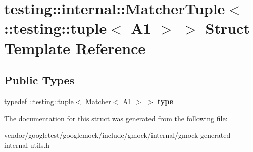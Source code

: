 \hypertarget{structtesting_1_1internal_1_1_matcher_tuple_3_01_1_1testing_1_1tuple_3_01_a1_01_4_01_4}{}\section{testing\+:\+:internal\+:\+:Matcher\+Tuple$<$ \+:\+:testing\+:\+:tuple$<$ A1 $>$ $>$ Struct Template Reference}
\label{structtesting_1_1internal_1_1_matcher_tuple_3_01_1_1testing_1_1tuple_3_01_a1_01_4_01_4}
\subsection*{Public Types}
\begin{DoxyCompactItemize}
\item 
\mbox{\label{structtesting_1_1internal_1_1_matcher_tuple_3_01_1_1testing_1_1tuple_3_01_a1_01_4_01_4_a8463ac100366f7e8b6ad1035e42ec4b0}} 
typedef \+::testing\+::tuple$<$ \mbox{\hyperlink{classtesting_1_1_matcher}{Matcher}}$<$ A1 $>$ $>$ {\bfseries type}
\end{DoxyCompactItemize}


The documentation for this struct was generated from the following file\+:\begin{DoxyCompactItemize}
\item 
vendor/googletest/googlemock/include/gmock/internal/gmock-\/generated-\/internal-\/utils.\+h\end{DoxyCompactItemize}
